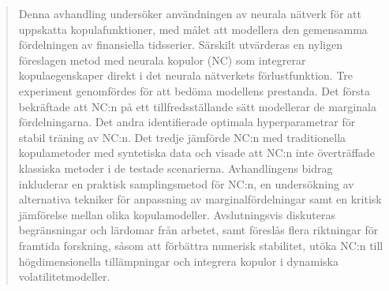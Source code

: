 \documentclass[%
a4paper,							
11pt,								
bibliography=totoc,						
abstracton=true					
]
{scrartcl}
\theoremstyle{plain}
\theoremstyle{definition}
\theoremstyle{remark}
\newcommand{\1}{\mathbbm{1}}
\begin{document}
\newpage
\renewcommand{\abstractname}{Sammanfattning}
\begin{abstract}

    Denna avhandling undersöker användningen av neurala nätverk för att uppskatta kopulafunktioner, med målet att modellera den gemensamma fördelningen av finansiella tidsserier. Särskilt utvärderas en nyligen föreslagen metod med neurala kopulor (NC) som integrerar kopulaegenskaper direkt i det neurala nätverkets förlustfunktion. Tre experiment genomfördes för att bedöma modellens prestanda. Det första bekräftade att NC:n på ett tillfredsställande sätt modellerar de marginala fördelningarna. Det andra identifierade optimala hyperparametrar för stabil träning av NC:n. Det tredje jämförde NC:n med traditionella kopulametoder med syntetiska data och visade att NC:n inte överträffade klassiska metoder i de testade scenarierna. Avhandlingens bidrag inkluderar en praktisk samplingsmetod för NC:n, en undersökning av alternativa tekniker för anpassning av marginalfördelningar samt en kritisk jämförelse mellan olika kopulamodeller. Avslutningsvis diskuteras begränsningar och lärdomar från arbetet, samt föreslås flera riktningar för framtida forskning, såsom att förbättra numerisk stabilitet, utöka NC:n till högdimensionella tillämpningar och integrera kopulor i dynamiska volatilitetmodeller.

\end{abstract}
\newpage
\end{document}
